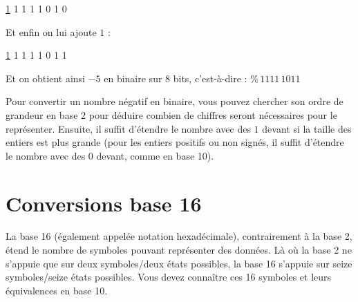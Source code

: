 \documentclass[11pt,a4paper]{article}
\begin{document}
{ \underline{1} \hspace*{0.2cm} 1 \hspace*{0.2cm} 1 \hspace*{0.2cm} 1 \hspace*{0.2cm} 1 \hspace*{0.2cm} 0 \hspace*{0.2cm} 1 \hspace*{0.2cm} 0 }

\medskip

Et enfin on lui ajoute $ 1 $ :

\medskip

{ \underline{1} \hspace*{0.2cm} 1 \hspace*{0.2cm} 1 \hspace*{0.2cm} 1 \hspace*{0.2cm} 1 \hspace*{0.2cm} 0 \hspace*{0.2cm} 1 \hspace*{0.2cm} 1 }

\medskip

Et on obtient ainsi $ -5 $ en binaire sur 8 bits, c'est-à-dire : $ \% \, 1111 \, 1011 $

\bigskip

Pour convertir un nombre négatif en binaire, vous pouvez chercher son ordre de grandeur en base 2 pour déduire combien de chiffres seront nécessaires pour le représenter.
Ensuite, il suffit d'étendre le nombre avec des $ 1 $ devant si la taille des entiers est plus grande (pour les entiers positifs ou non signés, il suffit d'étendre le nombre avec des $ 0 $ devant, comme en base 10).

\bigskip


\section{Conversions base 16}

\bigskip

La base 16 (également appelée notation hexadécimale), contrairement à la base 2, étend le nombre de symboles pouvant représenter des données.
Là où la base 2 ne s'appuie que sur deux symboles/deux états possibles, la base 16 s'appuie sur seize symboles/seize états possibles.
Vous devez connaître ces 16 symboles et leurs équivalences en base 10.

\bigskip
\end{document}
